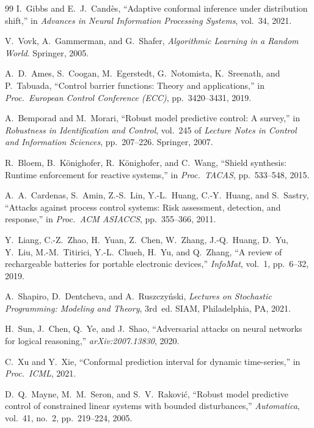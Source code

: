 \begin{thebibliography}{99}
I.~Gibbs and E.~J.~Candès,
``Adaptive conformal inference under distribution shift,''
in \emph{Advances in Neural Information Processing Systems}, vol.~34, 2021.

V.~Vovk, A.~Gammerman, and G.~Shafer,
\emph{Algorithmic Learning in a Random World}.
Springer, 2005.

A.~D.~Ames, S.~Coogan, M.~Egerstedt, G.~Notomista, K.~Sreenath, and P.~Tabuada,
``Control barrier functions: Theory and applications,''
in \emph{Proc.\ European Control Conference (ECC)}, pp.~3420--3431, 2019.

A.~Bemporad and M.~Morari,
``Robust model predictive control: A survey,''
in \emph{Robustness in Identification and Control}, vol.~245 of \emph{Lecture Notes in Control and Information Sciences}, pp.~207--226. Springer, 2007.

R.~Bloem, B.~K\"onighofer, R.~K\"onighofer, and C.~Wang,
``Shield synthesis: Runtime enforcement for reactive systems,''
in \emph{Proc.\ TACAS}, pp.~533--548, 2015.

A.~A.~Cardenas, S.~Amin, Z.-S.~Lin, Y.-L.~Huang, C.-Y.~Huang, and S.~Sastry,
``Attacks against process control systems: Risk assessment, detection, and response,''
in \emph{Proc.\ ACM ASIACCS}, pp.~355--366, 2011.

Y.~Liang, C.-Z.~Zhao, H.~Yuan, Z.~Chen, W.~Zhang, J.-Q.~Huang, D.~Yu,
Y.~Liu, M.-M.~Titirici, Y.-L.~Chueh, H.~Yu, and Q.~Zhang,
``A review of rechargeable batteries for portable electronic devices,''
\emph{InfoMat}, vol.~1, pp.~6--32, 2019.

A.~Shapiro, D.~Dentcheva, and A.~Ruszczy\'nski,
\emph{Lectures on Stochastic Programming: Modeling and Theory}, 3rd~ed.
SIAM, Philadelphia, PA, 2021.

H.~Sun, J.~Chen, Q.~Ye, and J.~Shao,
``Adversarial attacks on neural networks for logical reasoning,''
\emph{arXiv:2007.13830}, 2020.

C.~Xu and Y.~Xie,
``Conformal prediction interval for dynamic time-series,''
in \emph{Proc.\ ICML}, 2021.

D.~Q.~Mayne, M.~M.~Seron, and S.~V.~Rakovi\'{c},
``Robust model predictive control of constrained linear systems with bounded disturbances,''
\emph{Automatica}, vol.~41, no.~2, pp.~219--224, 2005.


\end{thebibliography}
